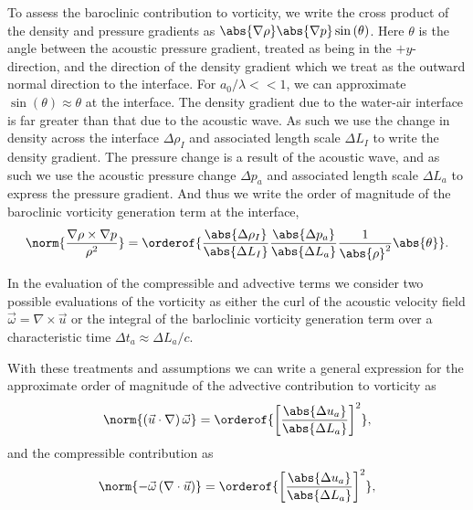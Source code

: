 To assess the baroclinic contribution to vorticity, we write the cross
product of the density and pressure gradients as
$\abs{\nabla \rho} \abs{\nabla p} \sin{\left(\theta\right)}$. Here
$\theta$ is the angle between the acoustic pressure gradient, treated
as being in the $\plus y$-direction, and the direction of the density
gradient which we treat as the outward normal direction to the
interface. For $a_0/\lambda<<1$, we can approximate
$\sin{\left(\theta\right)}\approx\theta$ at the interface. The density
gradient due to the water-air interface is far greater than that due
to the acoustic wave. As such we use the change in density across the
interface $\Delta \rho_I$ and associated length scale $\Delta L_I$ to
write the density gradient. The pressure change is a result of the
acoustic wave, and as such we use the acoustic pressure change
$\Delta p_a$ and associated length scale $\Delta L_a$ to express the
pressure gradient. And thus we write the order of magnitude of the
baroclinic vorticity generation term at the interface,
\begin{align}
  \label{eq:baroclinic_vorticity}%
  \norm{\frac{\nabla\rho\times\nabla p}{\rho^2}} = \orderof{\frac{\abs{\Delta \rho_I}}{\abs{\Delta L_I}}\frac{\abs{\Delta p_a}}{\abs{\Delta L_a}}\frac{1}{\abs{\rho}^2}\abs{\theta}}.%
\end{align}


In the evaluation of the compressible and advective terms we consider
two possible evaluations of the vorticity as either the curl of the
acoustic velocity field $\vec{\omega}=\nabla\times\vec{u}$ or the
integral of the barloclinic vorticity generation term over a
characteristic time $\Delta t_a\approx\Delta L_a/c$. 

With these treatments and assumptions we can write a general
expression for the approximate order of magnitude of the advective
contribution to vorticity as
\begin{align}
  \label{eq:advective_vorticity}%
  \norm{\left(\vec{u}\cdot\nabla\right)\vec{\omega}} = \orderof{\left[\frac{\abs{\Delta u_a}}{\abs{\Delta L_a}}\right]^2},%
\end{align}
and the compressible contribution as 
\begin{align}
  \label{eq:compressible_vorticity}%
  \norm{-\vec{\omega}\left(\nabla\cdot\vec{u}\right)} = \orderof{\left[\frac{\abs{\Delta u_a}}{\abs{\Delta L_a}}\right]^2},%
\end{align}






